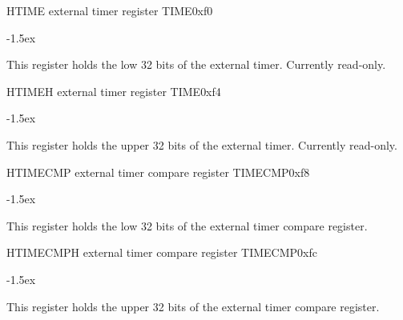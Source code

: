 \documentclass[12pt]{article}
\begin{document}
\begin{register}{H}{TIME external timer register TIME}{0xf0}
\label{time}
\regnewline%
\end{register}
\begin{regdesc}[0.8\textwidth]\begin{reglist}[00000]
\itemsep-1.5ex
\item [TIME] This register holds the low 32 bits of the external timer. Currently read-only.
\end{reglist}\end{regdesc}

\begin{register}{H}{TIMEH external timer register TIME}{0xf4}
\label{timeh}
\regnewline%
\end{register}
\begin{regdesc}[0.8\textwidth]\begin{reglist}[00000]
\itemsep-1.5ex
\item [TIMEH] This register holds the upper 32 bits of the external timer. Currently read-only.
\end{reglist}\end{regdesc}

\begin{register}{H}{TIMECMP external timer compare register TIMECMP}{0xf8}
\label{timecmp}
\regnewline%
\end{register}
\begin{regdesc}[0.8\textwidth]\begin{reglist}[00000000]
\itemsep-1.5ex
\item [TIMECMP] This register holds the low 32 bits of the external timer compare register.
\end{reglist}\end{regdesc}

\begin{register}{H}{TIMECMPH external timer compare register TIMECMP}{0xfc}
\label{timecmph}
\regnewline%
\end{register}
\begin{regdesc}[0.8\textwidth]\begin{reglist}[000000000]
\itemsep-1.5ex
\item [TIMECMPH] This register holds the upper 32 bits of the external timer compare register.
\end{reglist}\end{regdesc}
\end{document}
